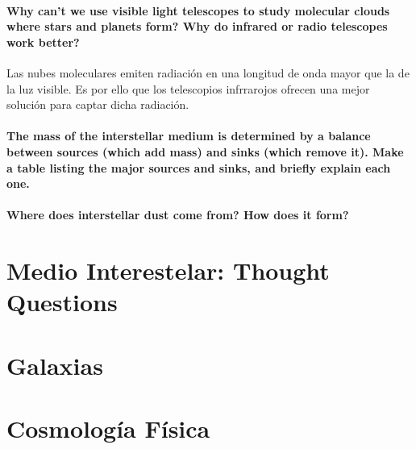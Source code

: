 \documentclass{tufte-handout}
\begin{document}
\paragraph{\textbf{Why can't we use visible light telescopes to study molecular clouds where stars and planets form? Why do
infrared or radio telescopes work better?}}

Las nubes moleculares emiten radiación en una longitud de onda mayor que la de la luz visible. Es por ello que los telescopios infrrarojos ofrecen una mejor solución para captar dicha radiación.

\paragraph{The mass of the interstellar medium is determined by a balance between sources (which add mass) and
sinks (which remove it). Make a table listing the major sources and sinks, and briefly explain each one.}

\paragraph{Where does interstellar dust come from? How does it form?}

\section{Medio Interestelar: Thought Questions}

\clearpage

\section{Galaxias}

\clearpage

\section{Cosmología Física}

\clearpage

\end{document}
